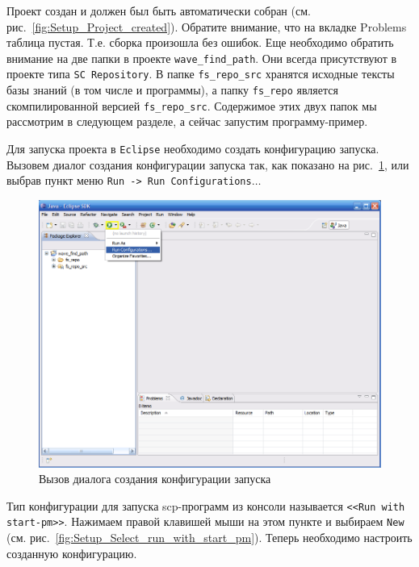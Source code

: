 Проект создан и должен был быть автоматически собран
(см. рис.~\ref{fig:Setup_Project_created}).  Обратите внимание, что на
вкладке Problems таблица пустая. Т.е. сборка произошла без ошибок. Еще
необходимо обратить внимание на две папки в проекте
\verb|wave_find_path|. Они всегда присутствуют в проекте типа
\texttt{SC Repository}. В папке \verb|fs_repo_src| хранятся исходные
тексты базы знаний (в том числе и программы), а папку \verb|fs_repo|
является скомпилированной версией \verb|fs_repo_src|. Содержимое этих
двух папок мы рассмотрим в следующем разделе, а сейчас запустим
программу-пример.

Для запуска проекта в \texttt{Eclipse} необходимо создать конфигурацию
запуска. Вызовем диалог создания конфигурации запуска так, как
показано на рис.~\ref{fig:Setup_Main_run_conf_dialog}, или выбрав
пункт меню \texttt{Run -> Run Configurations$\dots$}

\begin{figure}[h!]
  \centering
  \includegraphics[scale=0.5]{images/5/setup/6_Main_run_conf_dialog}
  \caption{Вызов диалога создания конфигурации запуска}
  \label{fig:Setup_Main_run_conf_dialog}
\end{figure}

Тип конфигурации для запуска scp-программ из консоли называется
\texttt{<<Run with start-pm>>}. Нажимаем правой клавишей мыши на этом
пункте и выбираем \texttt{New}
(см. рис.~\ref{fig:Setup_Select_run_with_start_pm}). Теперь необходимо
настроить созданную конфигурацию.

